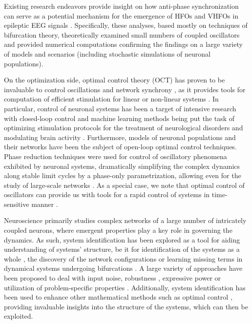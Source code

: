 \documentclass[a4paper,11pt]{scrartcl}
\begin{document}
Existing research endeavors provide insight on how anti-phase synchronization can serve as a potential mechanism for the emergence of HFOs and VHFOs in epileptic EEG signals \cite{Pribylova2024, Sevcik2024, Zathurecky2025}. Specifically, these analyses, based mostly on techniques of bifurcation theory, theoretically examined small numbers of coupled oscillators and provided numerical computations confirming the findings on a large variety of models and scenarios (including stochastic simulations of neuronal populations).

On the optimization side, optimal control theory (OCT) has proven to be invaluable to control oscillations and network synchrony \cite{Ruths2014, Orieux2024, Popovych2006, Costa2024}, as it provides tools for computation of efficient stimulation for linear or non-linear systems \cite{Kirk2004}. In particular, control of neuronal systems has been a target of intensive research \cite{Kao2019, Suppa2016, Liu2018} with closed-loop control and machine learning methods being put the task of optimizing stimulation protocols for the treatment of neurological disorders \cite{Yu2020} and modulating brain activity \cite{Tafazoli2020, Park2019}. Furthermore, models of neuronal populations \cite{Salfenmoser2022, Salfenmoser2024} and their networks \cite{Chouzouris2021} have been the subject of open-loop optimal control techniques. Phase reduction \cite{Zlotnik2012, Dasanayake2011, Pietras2019} techniques were used for control of oscillatory phenomena exhibited by neuronal systems, dramatically simplifying the complex dynamics along stable limit cycles by a phase-only parametrization, allowing even for the study of large-scale networks \cite{Bomela2023}. As a special case, we note that optimal control of oscillators can provide us with tools for a rapid control of systems in time-sensitive manner \cite{Kamzolkin2024, Santaniello2011}.

Neuroscience primarily studies complex networks of a large number of intricately coupled neurons, where emergent properties play a key role in governing the dynamics. As such, system identification has been explored as a tool for aiding understanding of systems' structure, be it for identification of the systems as a whole \cite{Brunton2019, Prokop2024}, the discovery of the network configurations \cite{Owens2022} or learning missing terms in dynamical systems undergoing bifurcations \cite{VortmeyerKley2021}. A large variety of approaches have been proposed to deal with input noise, robustness \cite{Kaheman2020, Rosafalco2024}, expressive power or utilization of problem-specific properties \cite{Bisheban2017, Jongeneel2022}. Additionally, system identification has been used to enhance other mathematical methods such as optimal control \cite{Morrison2021, Taylor2015}, providing invaluable insights into the structure of the systems, which can then be exploited.
\end{document}

